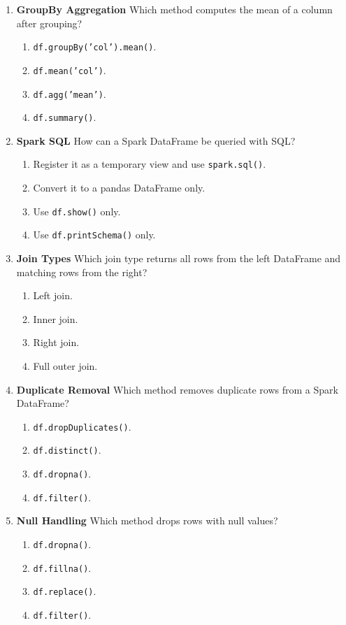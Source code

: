 \documentclass{article}
\begin{document}
\begin{enumerate}[label=\textbf{Q\arabic*.}]
		\item \textbf{GroupBy Aggregation}
		Which method computes the mean of a column after grouping?
		\begin{enumerate}[label=\Alph*.]
			\item \texttt{df.groupBy('col').mean()}.
			\item \texttt{df.mean('col')}.
			\item \texttt{df.agg('mean')}.
			\item \texttt{df.summary()}.
		\end{enumerate}
		
		\item \textbf{Spark SQL}
		How can a Spark DataFrame be queried with SQL?
		\begin{enumerate}[label=\Alph*.]
			\item Register it as a temporary view and use \texttt{spark.sql()}.
			\item Convert it to a pandas DataFrame only.
			\item Use \texttt{df.show()} only.
			\item Use \texttt{df.printSchema()} only.
		\end{enumerate}
		
		\item \textbf{Join Types}
		Which join type returns all rows from the left DataFrame and matching rows from the right?
		\begin{enumerate}[label=\Alph*.]
			\item Left join.
			\item Inner join.
			\item Right join.
			\item Full outer join.
		\end{enumerate}
		
		\item \textbf{Duplicate Removal}
		Which method removes duplicate rows from a Spark DataFrame?
		\begin{enumerate}[label=\Alph*.]
			\item \texttt{df.dropDuplicates()}.
			\item \texttt{df.distinct()}.
			\item \texttt{df.dropna()}.
			\item \texttt{df.filter()}.
		\end{enumerate}
		
		\item \textbf{Null Handling}
		Which method drops rows with null values?
		\begin{enumerate}[label=\Alph*.]
			\item \texttt{df.dropna()}.
			\item \texttt{df.fillna()}.
			\item \texttt{df.replace()}.
			\item \texttt{df.filter()}.
		\end{enumerate}
		

\end{enumerate}
\end{document}
